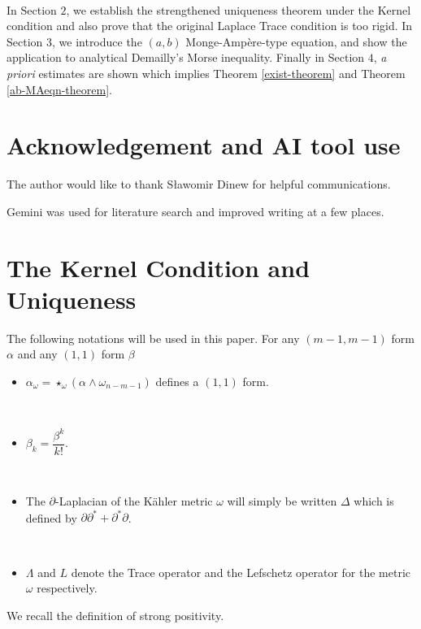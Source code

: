 \documentclass[10pt,a4paper]{amsart}
\newcommand{\spartial}{\partial^*}
\numberwithin{equation}{section}
\begin{document}
\

In Section $2$, we establish the strengthened uniqueness theorem under the Kernel condition and also prove that the original Laplace Trace condition is too rigid. In Section $3$, we introduce the $(a,b)$ Monge-Amp\`ere-type equation, and show the application to analytical Demailly's Morse inequality. Finally in Section $4$, \emph{a priori} estimates are shown which implies Theorem \ref{exist-theorem} and Theorem \ref{ab-MAeqn-theorem}.


\section*{Acknowledgement and AI tool use}

The author would like to thank Sławomir Dinew for helpful communications. 

Gemini was used for literature search and improved writing at a few places.



\section{The Kernel Condition and Uniqueness}

\bigskip


The following notations will be used in this paper. For any $(m-1,m-1)$ form $\alpha$ and any $(1,1)$ form $\beta$

\begin{itemize}

    \item $\alpha_{\omega} = \star_{\omega}(\alpha \wedge \omega_{n-m-1})$ defines a $(1,1)$ form.

    \

    \item $\beta_{k}=\dfrac{\beta^k}{k!}.$

    \

    \item The $\partial$-Laplacian of the K\"ahler metric $\omega$ will simply be written $\Delta$ which is defined by $\partial \spartial + \spartial \partial$.

    \

    \item $\Lambda$ and $L$ denote the Trace operator and the Lefschetz operator for the metric $\omega$ respectively.
\end{itemize}



We recall the definition of strong positivity.
\end{document}
